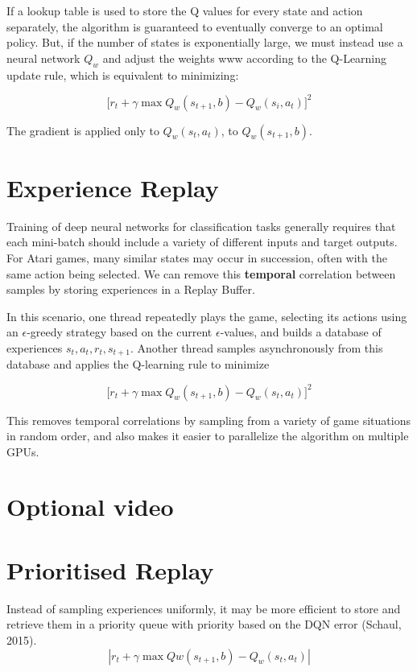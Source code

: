 \documentclass[11pt]{article}
\begin{document}
If a lookup table is used to store the Q values for every state and action
separately, the algorithm is guaranteed to eventually converge to an optimal
policy.
But, if the number of states is exponentially large, we must instead use a
neural network $Q_w$ and adjust the weights www according to the Q-Learning update
rule, which is equivalent to minimizing:

\[\Bigg[ r_t + \gamma \max Q_w (s_{t+1}, b) - Q_w (s_i, a_t) \Bigg]^2\]

The gradient is applied only to $Q_w (s_t, a_t)$,  to $Q_w (s_{t+1}, b)$.

\section{Experience Replay}\label{sec:experience-replay}
Training of deep neural networks for classification tasks generally requires
that each mini-batch should include a variety of different inputs and target
outputs.
For Atari games, many similar states may occur in succession, often with the
same action being selected.
We can remove this \textbf{temporal} correlation between samples by storing
experiences in a Replay Buffer.

In this scenario, one thread repeatedly plays the game, selecting its actions
using an $\epsilon$-greedy strategy based on the current $\epsilon$-values, and
builds a database of experiences $s_t, a_t, r_t, s_{t+1}$.
Another thread samples asynchronously from this database and applies the
Q-learning rule to minimize

\[\Bigg[ r_t + \gamma \max Q_w (s_{t+1}, b) - Q_w (s_t, a_t) \Bigg]^2\]

This removes temporal correlations by sampling from a variety of game
situations in random order, and also makes it easier to parallelize the
algorithm on multiple GPUs.

\section{Optional video}\label{sec:optional-video11}

\section{Prioritised Replay}\label{sec:prioritised-replay}
Instead of sampling experiences uniformly, it may be more efficient to store
and retrieve them in a priority queue with priority based on the DQN error (Schaul, 2015).
\[|r_t + \gamma \max Qw(s_{t+1}, b) - Q_w (s_t, a_t)|\]
\end{document}
